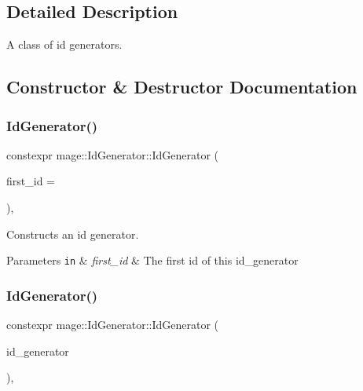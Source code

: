 \subsection{Detailed Description}
A class of id generators. 

\subsection{Constructor \& Destructor Documentation}
\hypertarget{classmage_1_1_id_generator_a62eacd065b27320c207d72acf94df7a3}{}\label{classmage_1_1_id_generator_a62eacd065b27320c207d72acf94df7a3} 
\subsubsection{\texorpdfstring{Id\+Generator()}{IdGenerator()}\hspace{0.1cm}{\footnotesize\ttfamily [1/3]}}
{\footnotesize\ttfamily constexpr mage\+::\+Id\+Generator\+::\+Id\+Generator (\begin{DoxyParamCaption}\item[{\hyperlink{namespacemage_a642e05c5c83642b6946703615cdbf2da}{S32}}]{first\+\_\+id = {} }\end{DoxyParamCaption})\hspace{0.3cm}{\ttfamily [explicit]}, {\ttfamily [noexcept]}}

Constructs an id generator.


\begin{DoxyParams}[1]{Parameters}
\mbox{\tt in}  & {\em first\+\_\+id} & The first id of this id\+\_\+generator \\
\hline
\end{DoxyParams}
\hypertarget{classmage_1_1_id_generator_ae7dbf4b3f0e959a923a098172731e562}{}\label{classmage_1_1_id_generator_ae7dbf4b3f0e959a923a098172731e562} 
\subsubsection{\texorpdfstring{Id\+Generator()}{IdGenerator()}\hspace{0.1cm}{\footnotesize\ttfamily [2/3]}}
{\footnotesize\ttfamily constexpr mage\+::\+Id\+Generator\+::\+Id\+Generator (\begin{DoxyParamCaption}\item[{const \hyperlink{classmage_1_1_id_generator}{Id\+Generator} \&}]{id\+\_\+generator }\end{DoxyParamCaption})\hspace{0.3cm}{\ttfamily [delete]}, {\ttfamily [noexcept]}}

